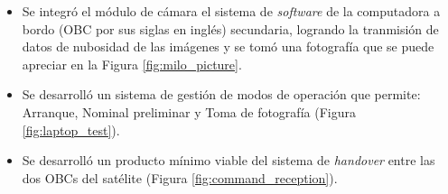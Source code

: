 \begin{itemize}

  \item Se integró el módulo de cámara el sistema de \textit{software} de la computadora a bordo (OBC por sus siglas en inglés) secundaria, logrando la tranmisión de datos de nubosidad de las imágenes y se tomó una fotografía que se puede apreciar en la Figura \ref{fig:milo_picture}.
  \item Se desarrolló un sistema de gestión de modos de operación que permite: Arranque, Nominal preliminar y Toma de fotografía (Figura \ref{fig:laptop_test}).
  \item Se desarrolló un producto mínimo viable del sistema de \textit{handover} entre las dos OBCs del satélite (Figura \ref{fig:command_reception}).
\end{itemize}

